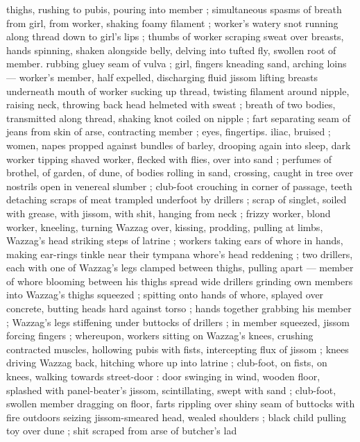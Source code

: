 thighs, rushing to pubis, pouring into member ; simultaneous spasms 
of breath from girl, from worker, shaking foamy filament ; worker's 
watery snot running along thread down to girl's lips ; thumbs of 
worker scraping sweat over breasts, hands spinning, shaken 
alongside belly, delving into tufted fly, swollen root of member. 
rubbing gluey seam of vulva ; girl, fingers kneading sand, arching 
loins --- worker's member, half expelled, discharging fluid jissom {\dashcom} 
lifting breasts underneath mouth of worker sucking up thread, 
twisting filament around nipple, raising neck, throwing back head 
helmeted with sweat ; breath of two bodies, transmitted along 
thread, shaking knot coiled on nipple ; fart separating seam of jeans 
from skin of arse, contracting member ; eyes, fingertips. iliac, 
bruised ; women, napes propped against bundles of barley, drooping 
again into sleep, dark worker tipping shaved worker, flecked with 
flies, over into sand ; perfumes of brothel, of garden, of dune, of 
bodies rolling in sand, crossing, caught in tree over nostrils open in 
venereal slumber ; club-foot crouching in corner of passage, teeth 
detaching scraps of meat trampled underfoot by drillers ; scrap of 
singlet, soiled with grease, with jissom, with shit, hanging from neck 
; frizzy worker, blond worker, kneeling, turning Wazzag over, kissing, 
prodding, pulling at limbs, Wazzag's head striking steps of latrine ; 
workers taking ears of whore in hands, making ear-rings tinkle near 
their tympana {\col} whore's head reddening ; two drillers, each with one 
of Wazzag's legs clamped between thighs, pulling apart --- member 
of whore blooming between his thighs spread wide {\dashcom} drillers 
grinding own members into Wazzag's thighs squeezed ; spitting onto 
hands of whore, splayed over concrete, butting heads hard against 
torso ; hands together grabbing his member ; Wazzag's legs 
stiffening under buttocks of drillers ; in member squeezed, jissom 
forcing fingers ; whereupon, workers sitting on Wazzag's knees, 
crushing contracted muscles, hollowing pubis with fists, intercepting 
flux of jissom ; knees driving Wazzag back, hitching whore up into 
latrine ; club-foot, on fists, on knees, walking towards street-door : 
door swinging in wind, wooden floor, splashed with panel-beater's 
jissom, scintillating, swept with sand ; club-foot, swollen member 
dragging on floor, farts rippling over shiny seam of buttocks with fire 
outdoors seizing jissom-smeared head, wealed shoulders ; black 
child pulling toy over dune ; shit scraped from arse of butcher's lad 

